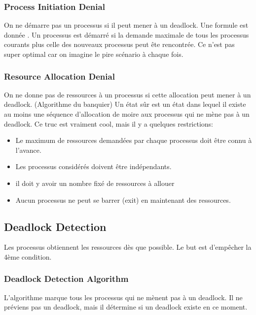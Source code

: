 \subsubsection{Process Initiation Denial}
On ne démarre pas un processus si il peut mener à un deadlock.
Une formule est donnée \cite[p.~271]{stallings}.
Un processus est démarré si la demande maximale de tous les processus courants plus celle des nouveaux processus peut ête rencontrée.
Ce n'est pas super optimal car on imagine le pire scénario à chaque fois.

\subsubsection{Resource Allocation Denial}
On ne donne pas de ressources à un processus si cette allocation peut mener à un deadlock.
(Algorithme du banquier)
Un état sûr est un état dans lequel il existe au moins une séquence d'allocation de moire aux processus qui ne mène pas à un deadlock.
Ce truc est vraiment cool, mais il y a quelques restrictions:
\begin{itemize}
  \item Le maximum de ressources demandées par chaque processus doit être connu à l'avance.
  \item Les processus considérés doivent être indépendants.
  \item il doit y avoir un nombre fixé de ressources à allouer
  \item Aucun processus ne peut se barrer (exit) en maintenant des ressources.
\end{itemize}

\subsection{Deadlock Detection}
Les processus obtiennent les ressources dès que possible.
Le but est d'empêcher la 4ème condition.

\subsubsection{Deadlock Detection Algorithm}
L'algorithme marque tous les processus qui ne mènent pas à un deadlock.
Il ne préviens pas un deadlock, mais il détermine si un deadlock existe en ce moment.

